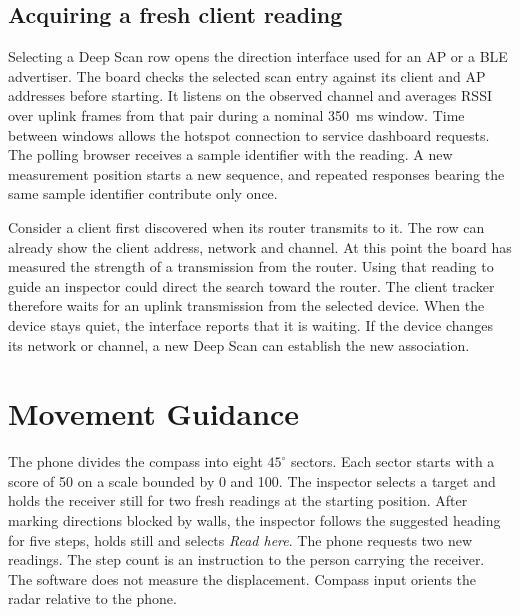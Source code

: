\documentclass[conference]{IEEEtran}
\begin{document}
\subsection{Acquiring a fresh client reading}
Selecting a Deep Scan row opens the direction interface used for an AP or a BLE advertiser. The board checks the selected scan entry against its client and AP addresses before starting. It listens on the observed channel and averages RSSI over uplink frames from that pair during a nominal 350~ms window. Time between windows allows the hotspot connection to service dashboard requests. The polling browser receives a sample identifier with the reading. A new measurement position starts a new sequence, and repeated responses bearing the same sample identifier contribute only once.

Consider a client first discovered when its router transmits to it. The row can already show the client address, network and channel. At this point the board has measured the strength of a transmission from the router. Using that reading to guide an inspector could direct the search toward the router. The client tracker therefore waits for an uplink transmission from the selected device. When the device stays quiet, the interface reports that it is waiting. If the device changes its network or channel, a new Deep Scan can establish the new association.

\section{Movement Guidance}
The phone divides the compass into eight $45^\circ$ sectors. Each sector starts with a score of 50 on a scale bounded by 0 and 100. The inspector selects a target and holds the receiver still for two fresh readings at the starting position. After marking directions blocked by walls, the inspector follows the suggested heading for five steps, holds still and selects \emph{Read here}. The phone requests two new readings. The step count is an instruction to the person carrying the receiver. The software does not measure the displacement. Compass input orients the radar relative to the phone.
\end{document}

